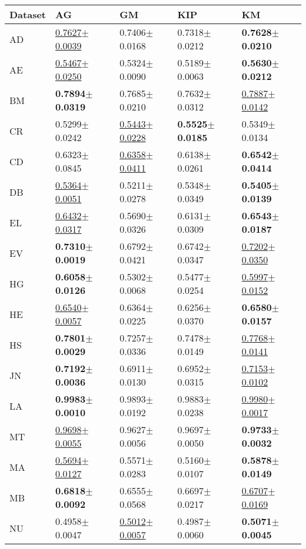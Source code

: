 \begin{tabular}{lllll}
\toprule
Dataset & AG & GM & KIP & KM \\
\midrule
AD & \underline{0.7627$\pm$0.0039} & 0.7406$\pm$0.0168 & 0.7318$\pm$0.0212 & \textbf{0.7628$\pm$0.0210} \\
AE & \underline{0.5467$\pm$0.0250} & 0.5324$\pm$0.0090 & 0.5189$\pm$0.0063 & \textbf{0.5630$\pm$0.0212} \\
BM & \textbf{0.7894$\pm$0.0319} & 0.7685$\pm$0.0210 & 0.7632$\pm$0.0312 & \underline{0.7887$\pm$0.0142} \\
CR & 0.5299$\pm$0.0242 & \underline{0.5443$\pm$0.0228} & \textbf{0.5525$\pm$0.0185} & 0.5349$\pm$0.0134 \\
CD & 0.6323$\pm$0.0845 & \underline{0.6358$\pm$0.0411} & 0.6138$\pm$0.0261 & \textbf{0.6542$\pm$0.0414} \\
DB & \underline{0.5364$\pm$0.0051} & 0.5211$\pm$0.0278 & 0.5348$\pm$0.0349 & \textbf{0.5405$\pm$0.0139} \\
EL & \underline{0.6432$\pm$0.0317} & 0.5690$\pm$0.0326 & 0.6131$\pm$0.0309 & \textbf{0.6543$\pm$0.0187} \\
EV & \textbf{0.7310$\pm$0.0019} & 0.6792$\pm$0.0421 & 0.6742$\pm$0.0347 & \underline{0.7202$\pm$0.0350} \\
HG & \textbf{0.6058$\pm$0.0126} & 0.5302$\pm$0.0068 & 0.5477$\pm$0.0254 & \underline{0.5997$\pm$0.0152} \\
HE & \underline{0.6540$\pm$0.0057} & 0.6364$\pm$0.0225 & 0.6256$\pm$0.0370 & \textbf{0.6580$\pm$0.0157} \\
HS & \textbf{0.7801$\pm$0.0029} & 0.7257$\pm$0.0336 & 0.7478$\pm$0.0149 & \underline{0.7768$\pm$0.0141} \\
JN & \textbf{0.7192$\pm$0.0036} & 0.6911$\pm$0.0130 & 0.6952$\pm$0.0315 & \underline{0.7153$\pm$0.0102} \\
LA & \textbf{0.9983$\pm$0.0010} & 0.9893$\pm$0.0192 & 0.9883$\pm$0.0238 & \underline{0.9980$\pm$0.0017} \\
MT & \underline{0.9698$\pm$0.0055} & 0.9627$\pm$0.0056 & 0.9697$\pm$0.0050 & \textbf{0.9733$\pm$0.0032} \\
MA & \underline{0.5694$\pm$0.0127} & 0.5571$\pm$0.0283 & 0.5160$\pm$0.0107 & \textbf{0.5878$\pm$0.0149} \\
MB & \textbf{0.6818$\pm$0.0092} & 0.6555$\pm$0.0568 & 0.6697$\pm$0.0217 & \underline{0.6707$\pm$0.0169} \\
NU & 0.4958$\pm$0.0047 & \underline{0.5012$\pm$0.0057} & 0.4987$\pm$0.0060 & \textbf{0.5071$\pm$0.0045} \\

\end{tabular}
